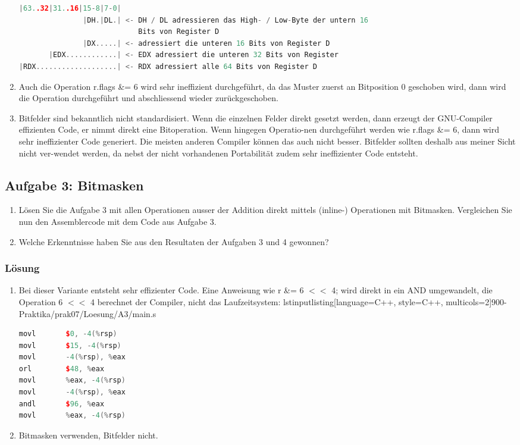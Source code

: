 \begin{enumerate}
\begin{lstlisting}[language=C++, style=C++]
|63..32|31..16|15-8|7-0|
               |DH.|DL.| <- DH / DL adressieren das High- / Low-Byte der untern 16
                            Bits von Register D
               |DX.....| <- adressiert die unteren 16 Bits von Register D
       |EDX............| <- EDX adressiert die unteren 32 Bits von Register
|RDX...................| <- RDX adressiert alle 64 Bits von Register D
\end{lstlisting}
\item Auch die Operation r.flags \&= 6 wird sehr ineffizient durchgeführt, da das Muster zuerst an Bitposition 0 geschoben wird, dann wird die Operation durchgeführt und abschliessend wieder zurückgeschoben.
\item Bitfelder sind bekanntlich nicht standardisiert. Wenn die einzelnen Felder direkt gesetzt werden, dann erzeugt der GNU-Compiler effizienten Code, er nimmt direkt eine Bitoperation. Wenn hingegen Operatio-nen durchgeführt werden wie r.flags \&= 6, dann wird sehr ineffizienter Code generiert. Die meisten anderen Compiler können das auch nicht besser. Bitfelder sollten deshalb aus meiner Sicht nicht ver-wendet werden, da nebst der nicht vorhandenen Portabilität zudem sehr ineffizienter Code entsteht.

\end{enumerate}

\subsection{Aufgabe 3: Bitmasken}
\begin{enumerate}
  \item Lösen Sie die Aufgabe 3 mit allen Operationen ausser der Addition direkt mittels (inline-) Operationen mit Bitmasken. Vergleichen Sie nun den Assemblercode mit dem Code aus Aufgabe 3.
\item  Welche Erkenntnisse haben Sie aus den Resultaten der Aufgaben 3 und 4 gewonnen?
\end{enumerate}

\subsubsection{Lösung}

\begin{enumerate}
  \item Bei dieser Variante entsteht sehr effizienter Code. Eine Anweisung wie r \&= 6 $<<$ 4; wird direkt in ein AND umgewandelt, die Operation 6 $<<$ 4 berechnet der Compiler, nicht das Laufzeitsystem:
  lstinputlisting[language=C++, style=C++, multicols=2]{900-Praktika/prak07/Loesung/A3/main.s}
  \begin{lstlisting}[language=C++, style=C++]
movl       $0, -4(%rsp)
movl       $15, -4(%rsp)
movl       -4(%rsp), %eax
orl        $48, %eax
movl       %eax, -4(%rsp)
movl       -4(%rsp), %eax
andl       $96, %eax
movl       %eax, -4(%rsp)
  \end{lstlisting}
  \item  Bitmasken verwenden, Bitfelder nicht.


\end{enumerate}
